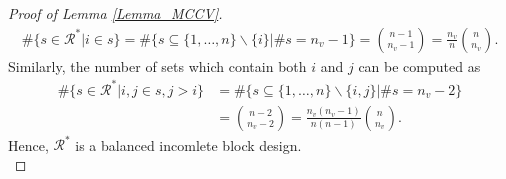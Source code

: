 \documentclass[Research_Module_ES.tex]{subfiles}
\begin{document}
\begin{proof}[Proof of Lemma \ref{Lemma_MCCV}]
	\begin{align*}
	\#\{s\in \mathcal{R}^\ast|i\in s\} = \#\{s \subseteq \{1,\dots, n\}\backslash\{i\} | \# s =n_v-1\} = \binom{n-1}{n_v-1} =\frac{n_v}{n}\binom{n}{n_v}.
	\end{align*}
	Similarly, the number of sets which contain both $i$ and $j$ can be computed as
	\begin{align*}
	\#\{s\in \mathcal{R}^\ast|i,j\in s , j>i\} &= \#\{s \subseteq \{1,\dots, n\}\backslash\{i,j\} | \# s =n_v-2\} \\
	&= \binom{n-2}{n_v-2} = \frac{n_v(n_v-1)}{n(n-1)}\binom{n}{n_v}.
	\end{align*}
	Hence, $\mathcal{R}^\ast$ is a balanced incomlete block design. \\
\end{proof}
\end{document}

